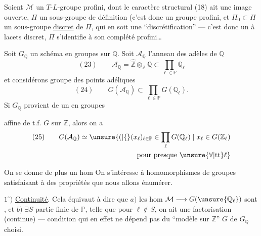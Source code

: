Soient \(\mathcal{M}\) un \(T\)-\(L\)-groupe profini, dont le caractère structural (18)
ait une image ouverte, \(\Pi\) un sous-groupe de définition  (c'est donc un groupe  profini\unsure{)|]}, et \(\Pi_0\subset\Pi\) un sous-groupe \uline{discret} de \(\Pi\), qui en soit une ``discrétification'' --- c'est donc un  à lacets discret,  \(\Pi\) s'identifie à son complété profini\ldots

Soit \(G_{\mathbb{Q}}\) un schéma en groupes  sur \(\mathbb{Q}\). Soit \(\mathcal{A}_{\mathbb{Q}}\) l'anneau des adèles de \(\mathbb{Q}\)
\[
(23)\qquad \mathcal{A}_{\mathbb{Q}}=\widehat{\mathbb{Z}}\otimes_{\mathbb{Z}}\mathbb{Q}\subset\prod_{\ell\in\mathbb{P}}\mathbb{Q}_{\ell}
\]
et considérons  groupe des points adéliques
\[
(24)\qquad G(\mathcal{A}_{\mathbb{Q}})\subset\prod_{\ell\in\mathbb{P}}G(\mathbb{Q}_{\ell}).
\]
Si \(G_{\mathbb{Q}}\) provient de un  en groupes

affine de t.f. \(G\) sur \(\mathbb{Z}\), alors on a
\[
\begin{gathered}
(25)\qquad G(\mathcal{A}_{\mathbb{Q}})\simeq
\unsure{(|\{}(x_{\ell})_{\ell\in\mathbb{P}}\in\prod_{\ell}G(\mathbb{Q}_{\ell})
\mid x_{\ell}\in G(\mathbb{Z}_{\ell})\\
\hfill\text{pour presque }\unsure{\forall|\mathrm{tt}}\ell\}
\end{gathered}
\]


On se donne de plus un hom
On s'intéresse à  homomorphismes de groupes
satisfaisant à des propriétés que nous allons énumérer.

\(1^\circ)\) \uline{Continuité}. Cela équivaut à dire que \(a)\) les hom \(\mathcal{M}\longrightarrow G(\unsure{\mathbb{Q}_{\ell}})\) sont , et \(b)\) \(\exists S\) partie finie de \(\mathbb{P}\), telle que pour \(\ell\notin S\), on ait  une factorisation (continue)
--- condition qui en effet ne dépend pas du ``modèle sur \(\mathbb{Z}\)'' \(G\) de \(G_{\mathbb{Q}}\) choisi.

